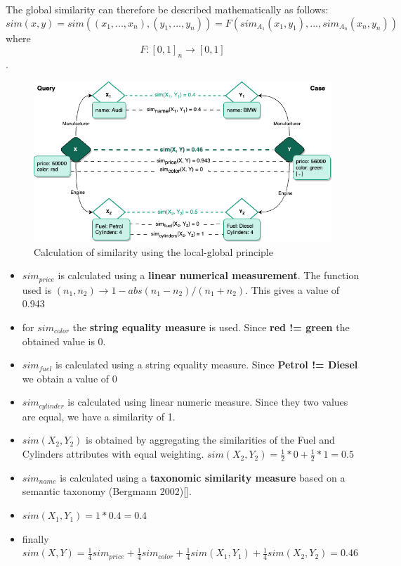     The global similarity can therefore be described mathematically as follows:\\
    \[sim(x,y) = sim((x_1,...,x_n),(y_1,...,y_n)) = F(sim_{A_1}(x_1, y_1),..., sim_{A_n}(x_n, y_n) )\] where \[F: [0,1]_n \rightarrow [0,1]\].\\


    \begin{figure}[H]
    \centering
    \includegraphics[scale=0.6]{images/Concept-CBR Exemple.drawio.png}
    \caption{\label{fig:cbr-exam}  Calculation of similarity using the local-global principle}
    \end{figure}
    
    \begin{itemize}
        \item $sim_{price}$ is calculated using a \textbf{linear numerical measurement}. The function used is $(n_1, n_2) \rightarrow 1 - abs(n_1 - n_2) / (n_1 + n_2)$. This gives a value of 0.943
        \item for $sim_{color}$ the \textbf{string equality measure} is used. Since \textbf{red != green} the obtained value is 0.
        \item $sim_{fuel}$ is calculated using a string equality measure. Since \textbf{Petrol != Diesel} we obtain a value of 0
        \item $sim_{cylinder}$ is calculated using linear numeric measure. Since they two values are equal, we have a similarity of 1.
        \item $sim(X_2, Y_2)$ is obtained by aggregating the similarities of the Fuel and Cylinders attributes with equal weighting. $sim(X_2, Y_2) = \frac{1}{2} * 0 + \frac{1}{2} * 1 = 0.5$
        \item $sim_{name}$ is calculated using a \textbf{taxonomic similarity measure} based on a semantic taxonomy (Bergmann 2002)[].
        \item $sim(X_1, Y_1) = 1 * 0.4 = 0.4$
        \item finally $sim(X, Y) = \frac{1}{4} sim_{price} + \frac{1}{4} sim_{color} + \frac{1}{4} sim(X_1, Y_1) + \frac{1}{4} sim(X_2, Y_2) = 0.46$

    \end{itemize}

